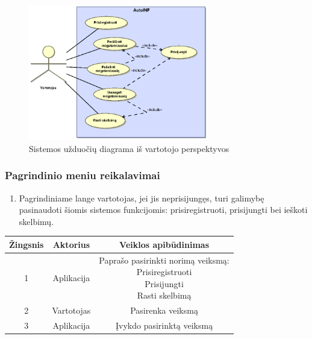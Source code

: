 \documentclass[12pt]{article}
\begin{document}
	\begin{figure}[h]
		\begin{center}
			\includegraphics[width=0.7\textwidth]{TikslaiVartotojas.eps}
			\caption{Sistemos užduočių diagrama iš vartotojo perspektyvos\label{UseCaseUser}}
		\end{center}
	\end{figure}
	\pagebreak
	
	\subsubsection{Pagrindinio meniu reikalavimai}
	\begin{enumerate}[labelindent=10pt,leftmargin=2.2cm]
		\item Pagrindiniame lange vartotojas, jei jis neprisijungęs, turi galimybę pasinaudoti šiomis sistemos funkcijomis: prisiregistruoti, prisijungti bei ieškoti skelbimų.
	\end{enumerate}
		
		\begin{center}
		\begin{tabular}{ | c | c | c | }
			\hline
			Žingsnis & Aktorius   & Veiklos apibūdinimas \\ \hline
			1        & Aplikacija & \makecell{Paprašo pasirinkti norimą veiksmą: \\ Prisiregistruoti \\ Prisijungti \\ Rasti skelbimą} \\ \hline
			2        & Vartotojas & Pasirenka veiksmą \\ \hline
			3        & Aplikacija & Įvykdo pasirinktą veiksmą \\ \hline
		\end{tabular}
		\bigskip
		\end{center}
		
\end{document}
